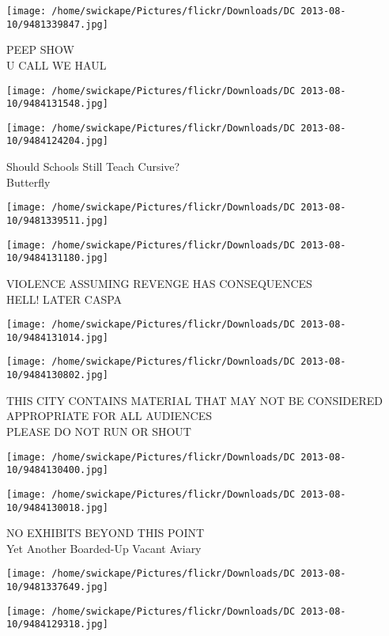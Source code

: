 \documentclass[10pt,letterpaper]{article}
\begin{document}
\vspace{0.25in}
\texttt{[image: /home/swickape/Pictures/flickr/Downloads/DC 2013-08-10/9481339847.jpg]}

PEEP SHOW\\
U CALL WE HAUL
\pagebreak

\texttt{[image: /home/swickape/Pictures/flickr/Downloads/DC 2013-08-10/9484131548.jpg]}

\vspace{0.25in}
\texttt{[image: /home/swickape/Pictures/flickr/Downloads/DC 2013-08-10/9484124204.jpg]}

Should Schools Still Teach Cursive?\\
Butterfly
\pagebreak

\texttt{[image: /home/swickape/Pictures/flickr/Downloads/DC 2013-08-10/9481339511.jpg]}

\vspace{0.25in}
\texttt{[image: /home/swickape/Pictures/flickr/Downloads/DC 2013-08-10/9484131180.jpg]}

VIOLENCE ASSUMING REVENGE HAS CONSEQUENCES\\
HELL!  LATER CASPA
\pagebreak

\texttt{[image: /home/swickape/Pictures/flickr/Downloads/DC 2013-08-10/9484131014.jpg]}

\vspace{0.25in}
\texttt{[image: /home/swickape/Pictures/flickr/Downloads/DC 2013-08-10/9484130802.jpg]}

THIS CITY CONTAINS MATERIAL THAT MAY NOT BE CONSIDERED APPROPRIATE FOR ALL AUDIENCES\\
PLEASE DO NOT RUN OR SHOUT
\pagebreak

\texttt{[image: /home/swickape/Pictures/flickr/Downloads/DC 2013-08-10/9484130400.jpg]}

\vspace{0.25in}
\texttt{[image: /home/swickape/Pictures/flickr/Downloads/DC 2013-08-10/9484130018.jpg]}

NO EXHIBITS BEYOND THIS POINT\\
Yet Another Boarded{-}Up Vacant Aviary
\pagebreak

\texttt{[image: /home/swickape/Pictures/flickr/Downloads/DC 2013-08-10/9481337649.jpg]}

\vspace{0.25in}
\texttt{[image: /home/swickape/Pictures/flickr/Downloads/DC 2013-08-10/9484129318.jpg]}
\end{document}

